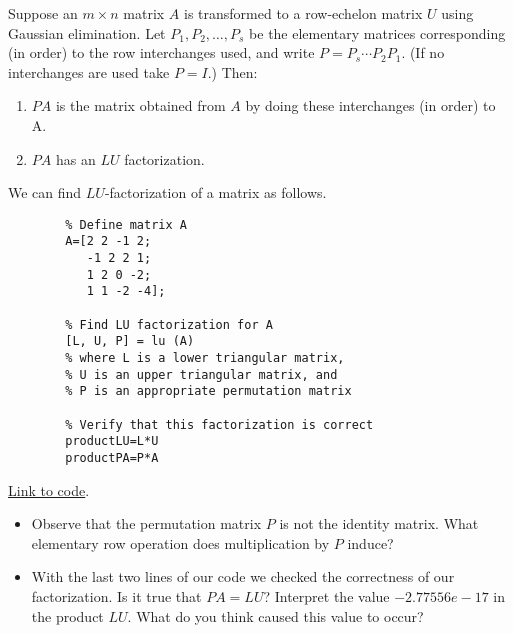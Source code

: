 \documentclass{ximera}
\begin{document}
\begin{theorem}[\ref{th:LUPA}]
Suppose an $m \times n$ matrix $A$ is transformed to a row-echelon matrix $U$ using Gaussian elimination. Let $P_1, P_2, \ldots, P_s$ be the elementary matrices corresponding (in order) to the row interchanges used,
and write $P=P_s \cdots P_2 P_1$. (If no interchanges are used take $P = I$.) Then:
\begin{enumerate}
\item $PA$ is the matrix obtained from $A$ by doing these interchanges (in order) to A.
\item $PA$ has an $LU$ factorization.
\end{enumerate}
\end{theorem}
    \begin{template}\label{temp:LU}
        We can find $LU$-factorization of a matrix as follows.  
        
        \begin{verbatim}
        % Define matrix A
        A=[2 2 -1 2;
           -1 2 2 1;
           1 2 0 -2;
           1 1 -2 -4];
           
        % Find LU factorization for A   
        [L, U, P] = lu (A)
        % where L is a lower triangular matrix,
        % U is an upper triangular matrix, and
        % P is an appropriate permutation matrix
        
        % Verify that this factorization is correct
        productLU=L*U
        productPA=P*A
        \end{verbatim}
        
        \href{https://sagecell.sagemath.org/?z=eJxtjrFqwzAURXeB_-EugTbYEJtuxYOgdNLgRV1CBmHLjcCRxKtEmn59n-y0UCgC8Y507uPu8GJn5y0uJpH7hKyE7I8dOjQtuudKAOvEp92owAFN90Mtz2ieThtXYodX5ycojdmMKZD7MskFjzkQ5GocVQ1dYzihx5LxIB9L6nq2ZKHgPmCwhKslcCPj3_Ni6F6vLqJeFY8c478O_03FG-6eiZFCZC1ZcOKS01Zo0ytR3DdLbr4hnU3ii3N_u_PDGIjsmCrBy6Y8JqV7tde_OMh-2Mtvdaxh4w==&lang=octave&interacts=eJyLjgUAARUAuQ==}{Link to code}.
        
        \begin{remark}
        \begin{itemize}
        \item Observe that the permutation matrix $P$ is not the identity matrix.  What elementary row operation does multiplication by $P$ induce?
            \item With the last two lines of our code we checked the correctness of our factorization.  Is it true that $PA=LU$?  Interpret the value $-2.77556e-17$ in the product $LU$.  What do you think caused this value to occur?  
        \end{itemize}
            \end{remark}
            
        \end{template}            
\end{document}
